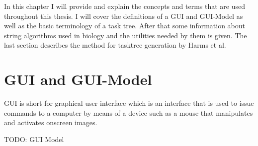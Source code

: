 In this chapter I will provide and explain the concepts and terms that are used throughout this thesis. 
I will cover the definitions of a GUI and GUI-Model as well as the basic terminology of a task tree. 
After that some information about string algorithms used in biology and the utilities needed by them is given.
The last section describes the method for tasktree generation by Harms et al. \cite{harms2013}


\section{GUI and GUI-Model}
\label{sec:foundationguiandguimodel}
GUI is short for graphical user interface which is an interface that is used to issue commands to a computer by means of a device such as a mouse that manipulates and activates onscreen images.\cite{Dictionary.com2014}

TODO: GUI Model

